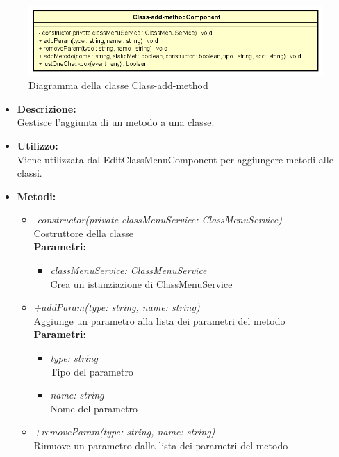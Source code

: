 \begin{figure}[h!]
	\centering
	\includegraphics[scale=0.8]{res/sections/SpecificaFrontEnd/Components/Disegnetti/class-add-method.png}
	\caption{Diagramma della classe Class-add-method}
\end{figure}

\begin{itemize}
	\item \textbf{Descrizione:}\\
	Gestisce l'aggiunta di un metodo a una classe.
	\item \textbf{Utilizzo:}\\
	Viene utilizzata dal EditClassMenuComponent per aggiungere metodi alle classi.
	\item \textbf{Metodi:}
		\begin{itemize}
			\item \emph{-constructor(private classMenuService: ClassMenuService)}\\
    		Costruttore della classe\\
    		\textbf{Parametri:}
    		\begin{itemize}
    			\item \emph{classMenuService: ClassMenuService}\\
    			Crea un istanziazione di ClassMenuService
    		\end{itemize}
    		\item \emph{+addParam(type: string, name: string)}\\
    		Aggiunge un parametro alla lista dei parametri del metodo\\
    		\textbf{Parametri:}
    		\begin{itemize}
    			\item \emph{type: string}\\
    			Tipo del parametro
    			\item \emph{name: string}\\
    			Nome del parametro
    		\end{itemize}
    		\item \emph{+removeParam(type: string, name: string)}\\
    		Rimuove un parametro dalla lista dei parametri del metodo\\

\end{itemize}
\end{itemize}

